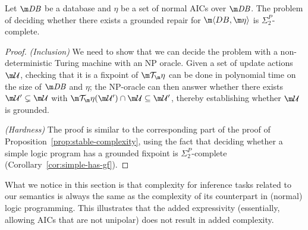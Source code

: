 \begin{proposition}
  \label{prop:grounded-complexity}
  Let $\db$ be a database and $\eta$ be a set of normal AICs over $\db$.
  The problem of deciding whether there exists a  grounded repair for $\fulldb$ is $\Sigma^P_2$-complete.
\end{proposition}
\begin{proof}
  \emph{(Inclusion)} We need to show that we can decide the problem with a non-deterministic Turing machine with an NP oracle.
  Given a set of update actions $\UU$, checking that it is a fixpoint of $\Op$ can be done in polynomial time on the size of $\db$ and $\eta$; the NP-oracle can then answer whether there exists $\UU'\subsetneq\UU$ with $\Op(\UU')\cap\UU\subseteq\UU'$, thereby establishing whether $\UU$ is grounded.

  \emph{(Hardness)}
  The proof is similar to the corresponding part of the proof of Proposition~\ref{prop:stable-complexity}, using the fact that deciding whether a simple logic program has a grounded fixpoint is $\Sigma^P_2$-complete (Corollary~\ref{cor:simple-has-gf}).
\end{proof}


What we notice in this section is that complexity for inference tasks related to our semantics is always the same as the complexity of its counterpart in (normal) logic programming. 
This illustrates that the added expressivity (essentially, allowing AICs that are not unipolar) does not result in added complexity. 

